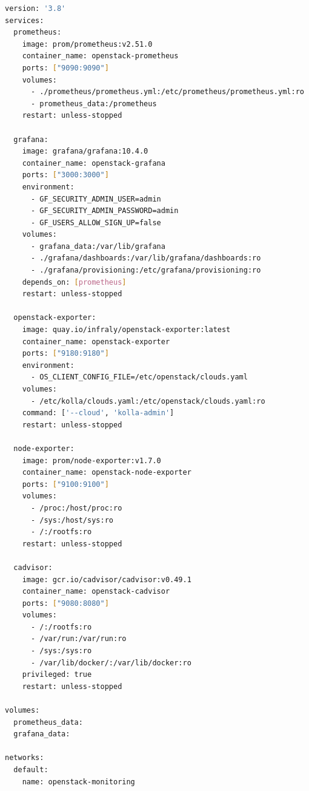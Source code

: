 \documentclass[12pt,a4paper,oneside]{book}
\begin{document}
\begin{lstlisting}[language=bash, caption={docker-compose.yml complet du stack monitoring}]
version: '3.8'
services:
  prometheus:
    image: prom/prometheus:v2.51.0
    container_name: openstack-prometheus
    ports: ["9090:9090"]
    volumes:
      - ./prometheus/prometheus.yml:/etc/prometheus/prometheus.yml:ro
      - prometheus_data:/prometheus
    restart: unless-stopped

  grafana:
    image: grafana/grafana:10.4.0
    container_name: openstack-grafana
    ports: ["3000:3000"]
    environment:
      - GF_SECURITY_ADMIN_USER=admin
      - GF_SECURITY_ADMIN_PASSWORD=admin
      - GF_USERS_ALLOW_SIGN_UP=false
    volumes:
      - grafana_data:/var/lib/grafana
      - ./grafana/dashboards:/var/lib/grafana/dashboards:ro
      - ./grafana/provisioning:/etc/grafana/provisioning:ro
    depends_on: [prometheus]
    restart: unless-stopped

  openstack-exporter:
    image: quay.io/infraly/openstack-exporter:latest
    container_name: openstack-exporter
    ports: ["9180:9180"]
    environment:
      - OS_CLIENT_CONFIG_FILE=/etc/openstack/clouds.yaml
    volumes:
      - /etc/kolla/clouds.yaml:/etc/openstack/clouds.yaml:ro
    command: ['--cloud', 'kolla-admin']
    restart: unless-stopped

  node-exporter:
    image: prom/node-exporter:v1.7.0
    container_name: openstack-node-exporter
    ports: ["9100:9100"]
    volumes:
      - /proc:/host/proc:ro
      - /sys:/host/sys:ro
      - /:/rootfs:ro
    restart: unless-stopped

  cadvisor:
    image: gcr.io/cadvisor/cadvisor:v0.49.1
    container_name: openstack-cadvisor
    ports: ["9080:8080"]
    volumes:
      - /:/rootfs:ro
      - /var/run:/var/run:ro
      - /sys:/sys:ro
      - /var/lib/docker/:/var/lib/docker:ro
    privileged: true
    restart: unless-stopped

volumes:
  prometheus_data:
  grafana_data:

networks:
  default:
    name: openstack-monitoring
\end{lstlisting}
\end{document}
